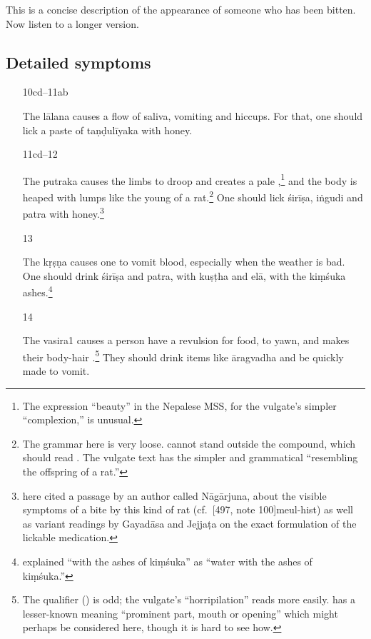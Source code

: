 \begin{translation}
This is a concise description of the appearance of someone who has been 
bitten.  Now listen to a longer version. 

\subsection{Detailed symptoms}

\begin{itemize}
\item[10cd--11ab]

The \Gls{lālana} causes a flow of saliva, vomiting and hiccups.  For that, one 
should lick a paste of \gls{taṇḍulīyaka} with honey. 

\item [11cd--12]

The \Gls{putraka} causes the limbs to droop and creates a pale
,\footnote{The expression  “beauty” in the
    Nepalese MSS, for the vulgate's simpler  “complexion,” is
    unusual.} and the body is heaped with lumps like the young of a
    rat.\footnote{The grammar here is very loose.  cannot
        stand outside the compound, which should read
        .  The vulgate text has the simpler and
        grammatical  “resembling the offspring of a
        rat.”}  One should lick \gls{śirīṣa}, \gls{iṅgudi} and \gls{patra}
        with honey.\footnote{ here cited a passage 
        by
            an author called Nāgārjuna, about the visible symptoms of a bite by
            this kind of rat (cf.\ [497, note 100]{meul-hist}) as well as 
            variant readings by Gayadāsa and Jejjaṭa on the exact formulation of 
            the lickable medication.}

\item [13]

The \Gls{kṛṣṇa} causes one to vomit blood, especially when the
weather is bad.  One should drink \gls{śirīṣa} and \gls{patra},  
with \gls{kuṣṭha} and \gls{elā}, with the 
\gls{kiṃśuka} ashes.\footnote{ explained “with the 
ashes of \gls{kiṃśuka}” as “water with the ashes of \gls{kiṃśuka}.”}

\item [14]

The \Gls{vasira1} causes a person have a revulsion for food, to yawn,
and makes their body-hair .\footnote{The qualifier
     () is odd; the vulgate's 
    “horripilation” reads more easily.  has a lesser-known
    meaning “prominent part, mouth or opening” which might perhaps be
    considered here, though it is hard to see how.}  They should drink
    items like \gls{āragvadha} and be quickly made to vomit.


\end{itemize}
\end{translation}
